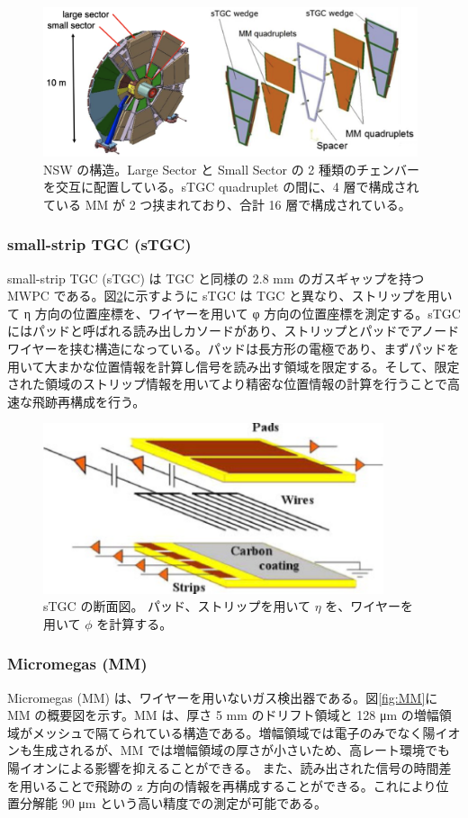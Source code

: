 \begin{figure}[tb]
  \centering
  \includegraphics[clip, width=11cm]{fig/2/nsw-structure.png}
  \caption{NSW の構造。Large Sector と Small Sector の 2 種類のチェンバーを交互に配置している。sTGC quadruplet の間に、4 層で構成されている MM が 2 つ挟まれており、合計 16 層で構成されている。}
  \label{fig:NSW}
\end{figure}

\subsubsection{small-strip TGC (sTGC)}
small-strip TGC (sTGC) は TGC と同様の 2.8 mm のガスギャップを持つ MWPC である。図\ref{fig:sTGC}に示すように sTGC は TGC と異なり、ストリップを用いて η 方向の位置座標を、ワイヤーを用いて φ 方向の位置座標を測定する。sTGC にはパッドと呼ばれる読み出しカソードがあり、ストリップとパッドでアノードワイヤーを挟む構造になっている。パッドは長方形の電極であり、まずパッドを用いて大まかな位置情報を計算し信号を読み出す領域を限定する。そして、限定された領域のストリップ情報を用いてより精密な位置情報の計算を行うことで高速な飛跡再構成を行う。

\begin{figure}[tb]
  \centering
  \includegraphics[clip, width=10cm]{fig/2/stgc-structure.pdf}
  \caption{sTGC の断面図。 パッド、ストリップを用いて $\eta$ を、ワイヤーを用いて $\phi$ を計算する。}
  \label{fig:sTGC}
\end{figure}

\subsubsection{Micromegas (MM)}
Micromegas (MM) は、ワイヤーを用いないガス検出器である。図\ref{fig:MM}に MM の概要図を示す。MM は、厚さ 5 mm のドリフト領域と 128 μm の増幅領域がメッシュで隔てられている構造である。増幅領域では電子のみでなく陽イオンも生成されるが、MM では増幅領域の厚さが小さいため、高レート環境でも陽イオンによる影響を抑えることができる。
また、読み出された信号の時間差を用いることで飛跡の z 方向の情報を再構成することができる。これにより位置分解能 90 μm という高い精度での測定が可能である。

